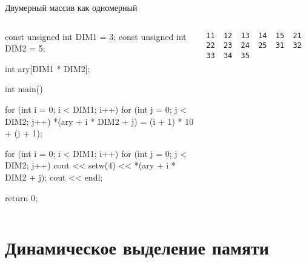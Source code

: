 \documentclass[
    9pt,
    hyperref={pdfencoding=unicode}
    ]{beamer}
\theoremstyle{definition}
\begin{document}
\begin{frame}[fragile]{Двумерный массив как одномерный}
    \footnotesize
    \begin{columns}
        \begin{column}{0.7\textwidth}
            \begin{cppcode}
                const unsigned int DIM1 = 3;
                const unsigned int DIM2 = 5;
                
                int ary[DIM1 * DIM2];
                
                int main() {
                    
                    for (int i = 0; i < DIM1; i++) {
                        for (int j = 0; j < DIM2; j++) {
                            *(ary + i * DIM2 + j) = (i + 1) * 10 + (j + 1);
                        }
                    }
                    
                    for (int i = 0; i < DIM1; i++) {
                        for (int j = 0; j < DIM2; j++) {
                            cout << setw(4) << *(ary + i * DIM2 + j);
                        }
                        cout << endl;
                    }
                    
                    return 0;
                }
            \end{cppcode}
        \end{column}
        \begin{column}{0.3\textwidth}
            \begin{verbatim}
11  12  13  14  15  21  22  23  24  25  31  32  33  34  35
            \end{verbatim}
        \end{column}
    \end{columns}
    
\end{frame}

\section{Динамическое выделение памяти}
\end{document}
